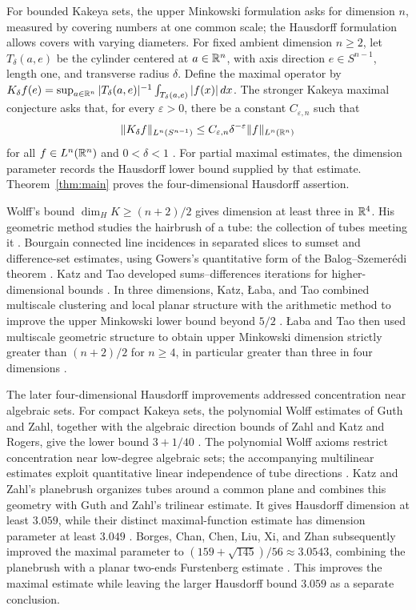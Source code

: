 For bounded Kakeya sets, the upper Minkowski formulation asks for
dimension \(n\), measured by covering numbers at one common scale;
the Hausdorff formulation allows covers with varying diameters.
For fixed ambient dimension \(n\ge2\), let \(T_\delta(a,e)\) be the
cylinder centered at \(a\in\mathbb R^n\), with axis direction
\(e\in S^{n-1}\), length one, and transverse radius \(\delta\).
Define the maximal operator by
\(K_\delta f(e)=\sup_{a\in\mathbb R^n}|T_\delta(a,e)|^{-1}
\int_{T_\delta(a,e)}|f(x)|\,dx\).
The stronger Kakeya maximal conjecture asks that, for every
\(\varepsilon>0\), there be a constant \(C_{\varepsilon,n}\) such that
\[
 \|K_\delta f\|_{L^n(S^{n-1})}
 \leq C_{\varepsilon,n}\delta^{-\varepsilon}
       \|f\|_{L^n(\mathbb R^n)}
\]
for all \(f\in L^n(\mathbb R^n)\) and \(0<\delta<1\)
\citep{KatzTaoNewBounds}. For partial maximal estimates, the
dimension parameter records the Hausdorff lower bound supplied by
that estimate. Theorem~\ref{thm:main} proves the four-dimensional
Hausdorff assertion.

Wolff's bound \(\dim_H K\ge(n+2)/2\) gives dimension at least three
in \(\mathbb R^4\). His geometric method studies the hairbrush of a tube:
the collection of tubes meeting it
\citep{Wolff1995,GuthZahlPolynomialWolff}.
Bourgain connected line incidences in separated slices to sumset
and difference-set estimates, using Gowers's quantitative form of
the Balog--Szemer\'edi theorem \citep{Bourgain1999}.
Katz and Tao developed sums--differences iterations for
higher-dimensional bounds \citep{KatzTaoNewBounds}.
In three dimensions, Katz, \L{}aba, and Tao combined multiscale
clustering and local planar structure with the arithmetic method
to improve the upper Minkowski lower bound beyond \(5/2\)
\citep{KatzLabaTao2000}.
\L{}aba and Tao then used multiscale geometric structure to obtain
upper Minkowski dimension strictly greater than \((n+2)/2\) for
\(n\ge4\), in particular greater than three in four dimensions
\citep[Theorem~1.3]{LabaTaoMediumDimension}.

The later four-dimensional Hausdorff improvements addressed
concentration near algebraic sets. For compact Kakeya sets,
the polynomial Wolff estimates of Guth and Zahl, together with the
algebraic direction bounds of Zahl and Katz and Rogers, give the
lower bound \(3+1/40\)
\citep{GuthZahlPolynomialWolff,ZahlSeveri,KatzRogersPolynomialWolff}.
The polynomial Wolff axioms restrict concentration near low-degree
algebraic sets; the accompanying multilinear estimates exploit
quantitative linear independence of tube directions
\citep{GuthZahlPolynomialWolff}.
Katz and Zahl's planebrush organizes tubes around a common plane
and combines this geometry with Guth and Zahl's trilinear estimate.
It gives Hausdorff dimension at least \(3.059\), while their distinct
maximal-function estimate has dimension parameter at least \(3.049\)
\citep{KatzZahlPlanebrush}.
Borges, Chan, Chen, Liu, Xi, and Zhan subsequently improved the
maximal parameter to
\((159+\sqrt{145})/56\approx3.0543\), combining the planebrush
with a planar two-ends Furstenberg estimate
\citep[Theorem~1.2]{BorgesEtAlRestrictionKakeya}.
This improves the maximal estimate while leaving the larger
Hausdorff bound \(3.059\) as a separate conclusion.

